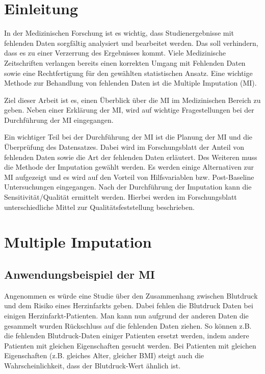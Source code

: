 \section{Einleitung}
\label{section:Introduction}

In der Medizinischen Forschung ist es wichtig, dass Studienergebnisse mit 
fehlenden Daten sorgfältig analysiert und bearbeitet werden. Das soll verhindern, dass es zu einer Verzerrung des 
Ergebnisses kommt. Viele Medizinische Zeitschriften verlangen bereits einen korrekten Umgang mit Fehlenden Daten sowie 
eine Rechtfertigung für den gewählten statistischen Ansatz. \autocite[163]{Lee2014} 
Eine wichtige Methode zur Behandlung von fehlenden Daten ist die Multiple Imputation (MI).

Ziel dieser Arbeit ist es, einen Überblick über die MI im Medizinischen Bereich zu geben. Neben einer 
Erklärung der MI, wird auf wichtige Fragestellungen bei der Durchführung der MI eingegangen.

Ein wichtiger Teil bei der Durchführung der MI ist die Planung der MI und die Überprüfung des Datensatzes. 
Dabei wird im Forschungsblatt der Anteil von fehlenden Daten sowie die Art der fehlenden Daten erläutert. 
Des Weiteren muss die Methode der Imputation gewählt werden. Es werden einige Alternativen zur MI aufgezeigt und es 
wird auf den Vorteil von Hilfsvariablen bzw. Post-Baseline Untersuchungen eingegangen. Nach der Durchführung der Imputation 
kann die Sensitivität/Qualität ermittelt werden. Hierbei werden im Forschungsblatt unterschiedliche Mittel zur 
Qualitätsfeststellung beschrieben.


\section{Multiple Imputation}
\label{section:MI}

\subsection{Anwendungsbeispiel der MI}

Angenommen es würde eine Studie über den Zusammenhang zwischen Blutdruck und dem Risiko eines Herzinfarkts geben. 
Dabei fehlen die Blutdruck Daten bei einigen Herzinfarkt-Patienten. Man kann nun aufgrund der anderen Daten die 
gesammelt wurden Rückschluss auf die fehlenden Daten ziehen. So können z.B. die fehlenden Blutdruck-Daten einiger 
Patienten ersetzt werden, indem andere Patienten mit gleichen Eigenschaften gesucht werden. Bei Patienten mit gleichen 
Eigenschaften (z.B. gleiches Alter, gleicher BMI) steigt auch die Wahrscheinlichkeit, dass der Blutdruck-Wert ähnlich ist. 

